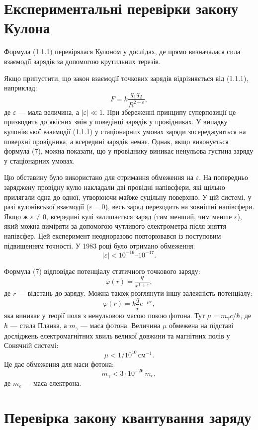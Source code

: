 \documentclass[14pt]{extarticle}
\title{}
\author{}
\begin{document}
\section{Експериментальні перевірки закону Кулона}

Формула (1.1.1) перевірялася Кулоном у дослідах, де прямо визначалася сила взаємодії зарядів за допомогою крутильних терезів.

Якщо припустити, що закон взаємодії точкових зарядів відрізняється від (1.1.1), наприклад:
\[
F = k \frac{q_1 q_2}{R^{2 + \varepsilon}},
\]
де $\varepsilon$ — мала величина, а $|\varepsilon| \ll 1$. При збереженні принципу суперпозиції це призводить до якісних змін у поведінці зарядів у
провідниках. У випадку кулонівської взаємодії (1.1.1) у стаціонарних умовах заряди зосереджуються на поверхні провідника, а всередині зарядів немає.
Однак, якщо виконується формула (7), можна показати, що у провіднику виникає ненульова густина заряду у стаціонарних умовах.

Цю обставину було використано для отримання обмеження на $\varepsilon$. На попередньо заряджену провідну кулю накладали дві провідні напівсфери, які
щільно прилягали одна до одної, утворюючи майже суцільну поверхню. У цій системі, у разі кулонівської взаємодії ($\varepsilon = 0$), весь заряд
переходить на зовнішні напівсфери. Якщо ж $\varepsilon \neq 0$, всередині кулі залишається заряд (тим менший, чим менше $\varepsilon$), який можна
виміряти за допомогою чутливого електрометра після зняття напівсфер. Цей експеримент неодноразово повторювався із поступовим підвищенням точності. У
1983 році було отримано обмеження:
\[
|\varepsilon| < 10^{-16} \text{–} 10^{-17}.
\]

Формула (7) відповідає потенціалу статичного точкового заряду:
\[
\varphi(r) = \frac{q}{r^{1 + \varepsilon}},
\]
де $r$ — відстань до заряду. Можна також розглянути іншу залежність потенціалу:
\[
\varphi(r) = k \frac{q}{r} e^{-\mu r},
\]
яка виникає у теорії поля з ненульовою масою покою фотона. Тут $\mu = m_\gamma c / \hbar$, де $\hbar$ — стала Планка, а $m_\gamma$ — маса фотона.
Величина $\mu$ обмежена на підставі досліджень електромагнітних хвиль великої довжини та магнітних полів у Сонячній системі:
\[
\mu < 1 / 10^{10} \, \text{см}^{-1}.
\]
Це дає обмеження для маси фотона:
\[
m_\gamma < 3 \cdot 10^{-26} \, m_e,
\]
де $m_e$ — маса електрона.

\section{Перевірка закону квантування заряду}
\end{document}
